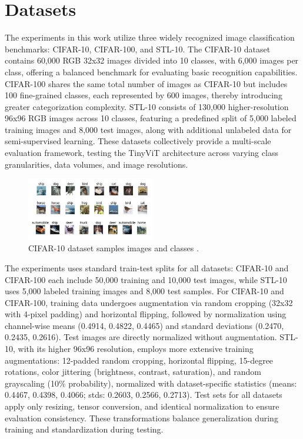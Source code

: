 \section{Datasets}
The experiments in this work utilize three widely recognized image classification benchmarks: CIFAR-10, CIFAR-100, and STL-10. The CIFAR-10 dataset contains 60,000 RGB 32x32 images divided into 10 classes, with 6,000 images per class, offering a balanced benchmark for evaluating basic recognition capabilities. CIFAR-100 shares the same total number of images as CIFAR-10 but includes 100 fine-grained classes, each represented by 600 images, thereby introducing greater categorization complexity. STL-10 consists of 130,000 higher-resolution 96x96 RGB images across 10 classes, featuring a predefined split of 5,000 labeled training images and 8,000 test images, along with additional unlabeled data for semi-supervised learning. These datasets collectively provide a multi-scale evaluation framework, testing the TinyViT architecture across varying class granularities, data volumes, and image resolutions.

\begin{figure}[H]
    \centering
    \includegraphics[width=0.5\textwidth]{images/cifar-10.jpg}
    \caption{CIFAR-10 dataset samples images and classes \cite{krizhevsky2009learning}.}
    \label{fig:datasets}
\end{figure}

The experiments uses standard train-test splits for all datasets: CIFAR-10 and CIFAR-100 each include 50,000 training and 10,000 test images, while STL-10 uses 5,000 labeled training images and 8,000 test samples. For CIFAR-10 and CIFAR-100, training data undergoes augmentation via random cropping (32x32 with 4-pixel padding) and horizontal flipping, followed by normalization using channel-wise means (0.4914, 0.4822, 0.4465) and standard deviations (0.2470, 0.2435, 0.2616). Test images are directly normalized without augmentation. STL-10, with its higher 96x96 resolution, employs more extensive training augmentations: 12-padded random cropping, horizontal flipping, 15-degree rotations, color jittering (brightness, contrast, saturation), and random grayscaling (10\% probability), normalized with dataset-specific statistics (means: 0.4467, 0.4398, 0.4066; stds: 0.2603, 0.2566, 0.2713). Test sets for all datasets apply only resizing, tensor conversion, and identical normalization to ensure evaluation consistency. These transformations balance generalization during training and standardization during testing.